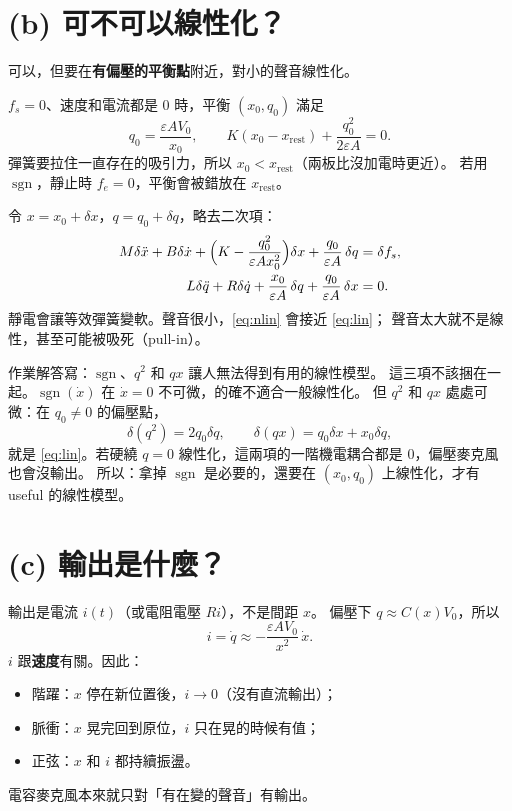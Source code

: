 \documentclass[12pt,a4paper]{article}
\begin{document}
\section{(b) 可不可以線性化？}

可以，但要在\textbf{有偏壓的平衡點}附近，對小的聲音線性化。

\(f_s=0\)、速度和電流都是 0 時，平衡 \((x_0,q_0)\) 滿足
\begin{equation}
  q_0=\frac{\varepsilon A V_0}{x_0},\qquad
  K(x_0-x_{\mathrm{rest}})+\frac{q_0^2}{2\varepsilon A}=0.
\label{eq:eqpt}
\end{equation}
彈簧要拉住一直存在的吸引力，所以 \(x_0<x_{\mathrm{rest}}\)（兩板比沒加電時更近）。
若用 \(\operatorname{sgn}\)，靜止時 \(f_e=0\)，平衡會被錯放在 \(x_{\mathrm{rest}}\)。

令 \(x=x_0+\delta x\)，\(q=q_0+\delta q\)，略去二次項：
\begin{equation}
\begin{aligned}
  M\delta\ddot{x}+B\delta\dot{x}
  +\Bigl(K-\frac{q_0^2}{\varepsilon A x_0^2}\Bigr)\delta x
  +\frac{q_0}{\varepsilon A}\,\delta q
  &=\delta f_s,\\
  L\delta\ddot{q}+R\delta\dot{q}
  +\frac{x_0}{\varepsilon A}\,\delta q
  +\frac{q_0}{\varepsilon A}\,\delta x
  &=0.
\end{aligned}
\label{eq:lin}
\end{equation}
靜電會讓等效彈簧變軟。聲音很小，\eqref{eq:nlin} 會接近 \eqref{eq:lin}；
聲音太大就不是線性，甚至可能被吸死（pull-in）。

作業解答寫：\(\operatorname{sgn}\)、\(q^2\) 和 \(qx\) 讓人無法得到有用的線性模型。
這三項不該捆在一起。\(\operatorname{sgn}(\dot{x})\) 在 \(\dot{x}=0\) 不可微，的確不適合一般線性化。
但 \(q^2\) 和 \(qx\) 處處可微：在 \(q_0\neq 0\) 的偏壓點，
\[
\delta(q^2)=2q_0\delta q,\qquad
\delta(qx)=q_0\delta x+x_0\delta q,
\]
就是 \eqref{eq:lin}。若硬繞 \(q=0\) 線性化，這兩項的一階機電耦合都是 0，偏壓麥克風也會沒輸出。
所以：拿掉 \(\operatorname{sgn}\) 是必要的，還要在 \((x_0,q_0)\) 上線性化，才有 useful 的線性模型。

\section{(c) 輸出是什麼？}

輸出是電流 \(i(t)\)（或電阻電壓 \(Ri\)），不是間距 \(x\)。
偏壓下 \(q\approx C(x)V_0\)，所以
\begin{equation}
  i=\dot{q}\approx -\frac{\varepsilon A V_0}{x^2}\,\dot{x}.
\label{eq:i}
\end{equation}
\(i\) 跟\textbf{速度}有關。因此：
\begin{itemize}
  \item 階躍：\(x\) 停在新位置後，\(i\to 0\)（沒有直流輸出）；
  \item 脈衝：\(x\) 晃完回到原位，\(i\) 只在晃的時候有值；
  \item 正弦：\(x\) 和 \(i\) 都持續振盪。
\end{itemize}
電容麥克風本來就只對「有在變的聲音」有輸出。
\end{document}
